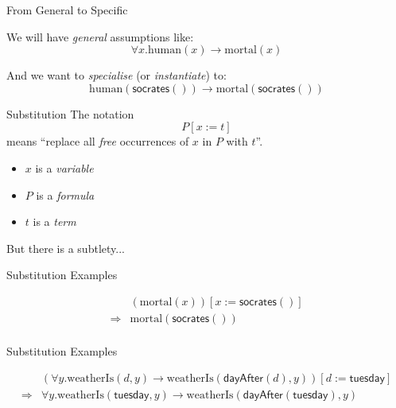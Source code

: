 \documentclass[xetex,aspectratio=169,14pt,hyperref={pdfpagelabels=true,pdflang={en-GB}}]{beamer}
\begin{document}
\begin{frame}
  {From General to Specific}

  We will have \emph{general} assumptions like:
  \begin{displaymath}
    \forall x. \mathrm{human}(x) \to \mathrm{mortal}(x)
  \end{displaymath}

  \bigskip

  And we want to \emph{specialise} (or \emph{instantiate}) to:
  \begin{displaymath}
    \mathrm{human}(\mathsf{socrates}()) \to \mathrm{mortal}(\mathsf{socrates}())
  \end{displaymath}
\end{frame}

\begin{frame}
  {Substitution}
  The notation
  \begin{displaymath}
    P[x:=t]
  \end{displaymath}
  means ``replace all \emph{free} occurrences of $x$ in $P$ with $t$''.
  \begin{itemize}
  \item $x$ is a \emph{variable}
  \item $P$ is a \emph{formula}
  \item $t$ is a \emph{term}
  \end{itemize}


  \bigskip

  \textcolor{black!60}{But there is a subtlety...}
\end{frame}

\begin{frame}
  {Substitution Examples}

  \begin{displaymath}
    \begin{array}{cl}
      &(\mathrm{mortal}(x))[x := \mathsf{socrates}()]\\
      \Longrightarrow&\mathrm{mortal}(\mathsf{socrates}())\\
    \end{array}
  \end{displaymath}
\end{frame}

\begin{frame}
  {Substitution Examples}

  \begin{displaymath}
    \begin{array}{cl}
      &(\forall y. \mathrm{weatherIs}(d,y) \to \mathrm{weatherIs}(\mathsf{dayAfter}(d),y))[d:=\mathsf{tuesday}]\\
      \Longrightarrow&\forall y. \mathrm{weatherIs}(\mathsf{tuesday},y) \to \mathrm{weatherIs}(\mathsf{dayAfter}(\mathsf{tuesday}),y)\\
    \end{array}
  \end{displaymath}
\end{frame}
\end{document}
